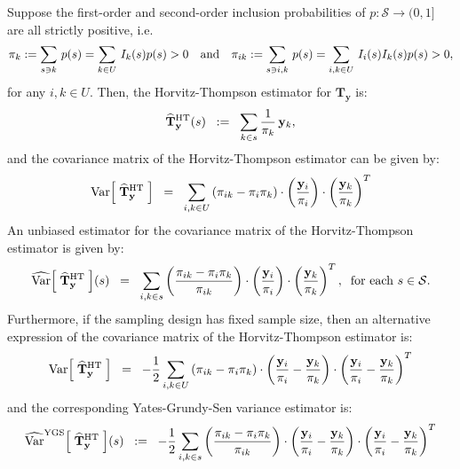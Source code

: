 \documentclass{article}
\begin{document}
\begin{proposition}
\mbox{}
\vskip 0.1cm
\noindent
Suppose the first-order and second-order inclusion probabilities of $p:\mathcal{S}\longrightarrow(0,1]$
are all strictly positive, i.e.
\begin{equation*}
\pi_{k} := \sum_{s \ni k}\,p(s) = \sum_{k \in U}\,I_{k}(s)p(s) > 0
\quad\textnormal{and}\quad
\pi_{ik} := \sum_{s \ni i,k}\,p(s) = \sum_{i,k \in U}\,I_{i}(s)I_{k}(s)p(s) > 0,
\end{equation*}
for any $i,k \in U$.
Then, the Horvitz-Thompson estimator for $\mathbf{T}_{\mathbf{y}}$ is:
\begin{equation*}
\widehat{\mathbf{T}}^{\textnormal{HT}}_{\mathbf{y}}(s)
\;\;:=\;\; \sum_{k \in s} \dfrac{1}{\pi_{k}}\,\mathbf{y}_{k},
\end{equation*}
and the covariance matrix of the Horvitz-Thompson estimator can be given by:
\begin{equation*}
\textnormal{Var}\!\left[\;\widehat{\mathbf{T}}^{\textnormal{HT}}_{\mathbf{y}}\;\right]
\;\;=\;\; \sum_{i,k \in U}\left(\pi_{ik} - \pi_{i}\pi_{k}\right)\cdot
\left(\dfrac{\mathbf{y}_{i}}{\pi_{i}}\right)\cdot\left(\dfrac{\mathbf{y}_{k}}{\pi_{k}}\right)^{T}
\end{equation*}
An unbiased estimator for the covariance matrix of the Horvitz-Thompson estimator is given by:
\begin{equation*}
\widehat{\textnormal{Var}}\!\left[\;\widehat{\mathbf{T}}^{\textnormal{HT}}_{\mathbf{y}}\;\right]\!(s)
\;\;=\;\;
\sum_{i,k \in s}\left(\dfrac{\pi_{ik} - \pi_{i}\pi_{k}}{\pi_{ik}}\right)\cdot\left(\dfrac{\mathbf{y}_{i}}{\pi_{i}}\right)\cdot\left(\dfrac{\mathbf{y}_{k}}{\pi_{k}}\right)^{T},
\;\;\textnormal{for each $s \in \mathcal{S}$}.
\end{equation*}
Furthermore, if the sampling design has fixed sample size, then an alternative expression
of the covariance matrix of the Horvitz-Thompson estimator is:
\begin{equation*}
\textnormal{Var}\!\left[\;\widehat{\mathbf{T}}^{\textnormal{HT}}_{\mathbf{y}}\;\right]
\;\;=\;\; -\dfrac{1}{2}\sum_{i,k \in U}\left(\pi_{ik} - \pi_{i}\pi_{k}\right)\cdot
\left(\dfrac{\mathbf{y}_{i}}{\pi_{i}} - \dfrac{\mathbf{y}_{k}}{\pi_{k}}\right)\cdot
\left(\dfrac{\mathbf{y}_{i}}{\pi_{i}} - \dfrac{\mathbf{y}_{k}}{\pi_{k}}\right)^{T}
\end{equation*}
and the corresponding Yates-Grundy-Sen variance estimator is:
\begin{equation*}
\widehat{\textnormal{Var}}^{\textnormal{YGS}}\!\left[\;\widehat{\mathbf{T}}^{\textnormal{HT}}_{\mathbf{y}}\;\right]\!(s)
\;\;:=\;\; -\dfrac{1}{2}\sum_{i,k \in s}\left(\dfrac{\pi_{ik} - \pi_{i}\pi_{k}}{\pi_{ik}}\right)\cdot
\left(\dfrac{\mathbf{y}_{i}}{\pi_{i}} - \dfrac{\mathbf{y}_{k}}{\pi_{k}}\right)\cdot
\left(\dfrac{\mathbf{y}_{i}}{\pi_{i}} - \dfrac{\mathbf{y}_{k}}{\pi_{k}}\right)^{T}
\end{equation*}
\end{proposition}
\end{document}
